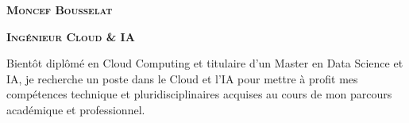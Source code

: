 \documentclass[letterpaper,12t]{article}
\begin{document}

\begin{center}
    \begin{minipage}[c]{0.17\textwidth}
        \centering
        \setlength{\fboxsep}{0.1pt}
        \setlength{\fboxrule}{2pt}
    \end{minipage}
    \hfill
    \begin{minipage}[c]{0.8\textwidth}
        \textbf{\LARGE \scshape Moncef Bousselat}
        \vspace{3pt}
    
        \textbf{\large \scshape Ingénieur Cloud \& IA}
        \vspace{5pt}

        \begin{minipage}{\textwidth}
            \justifying \small \noindent
            Bientôt diplômé en Cloud Computing et titulaire d'un Master en Data Science et IA, 
            je recherche un poste dans le Cloud et l'IA pour mettre à profit mes 
            compétences technique et pluridisciplinaires acquises au cours de mon 
            parcours académique et professionnel.
        \end{minipage}


\end{minipage}
\end{center}
\end{document}
